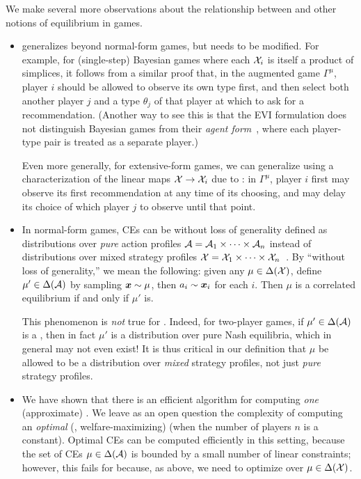 We make several more observations about the relationship between \jlces and other notions of equilibrium in games.
\begin{itemize}
    \item {} generalizes beyond normal-form games, but needs to be modified. For example, for (single-step) Bayesian games where each ${\mathcal{X}}_i$ is itself a product of simplices, it follows from a similar proof that, in the augmented game $\Gamma^\mu$, player $i$ should be allowed to observe its own type first, and then select both another player $j$ and a type $\theta_j$ of that player at which to ask for a recommendation. (Another way to see this is that the EVI formulation does not distinguish Bayesian games from their {\em agent form}~\citep{Kuhn53:Extensive}, where each player-type pair is treated as a separate player.)
    
    Even more generally, for extensive-form games, we can generalize \jlces using a characterization of the linear maps ${\mathcal{X}}\to{\mathcal{X}}_i$ due to \citet{Zhang24:Mediator}: in $\Gamma^\mu$, player $i$ first may  observe its first recommendation at any time of its choosing, and may delay its choice of which player $j$ to observe until that point.
    
    \item In normal-form games, CEs can be without loss of generality defined as distributions over {\em pure} action profiles ${\mathcal{A}} = {\mathcal{A}}_1 \times \dots \times {\mathcal{A}}_n$ instead of distributions over mixed strategy profiles ${\mathcal{X}}=  {\mathcal{X}}_1 \times \dots \times {\mathcal{X}}_n$~\citep{Aumann74:Subjectivity}. By ``without loss of generality,'' we mean the following: given any $\mu\in\Delta({\mathcal{X}})$, define $\mu'\in\Delta({\mathcal{A}})$ by sampling ${\bm{x}}\sim\mu$, then $a_i\sim{\bm{x}}_i$ for each $i$. Then $\mu$ is a correlated equilibrium if and only if $\mu'$ is.

    This phenomenon is {\em not} true for \jlces. Indeed, for two-player games, if $\mu'\in\Delta({\mathcal{A}})$ is a \jlce, then in fact $\mu'$ is a distribution over pure Nash equilibria, which in general may not even exist! It is thus critical in our definition that $\mu$ be allowed to be a distribution over {\em mixed} strategy profiles, not just {\em pure} strategy profiles.

    \item We have shown that there is an efficient algorithm for computing {\em one} (approximate) \jlce. We leave as an open question the complexity of computing an {\em optimal} (\eg, welfare-maximizing) \jlce (when the number of players $n$ is a constant). Optimal CEs can be computed efficiently in this setting, because the set of CEs $\mu\in\Delta({\mathcal{A}})$ is bounded by a small number of linear constraints; however, this fails for \jlces because, as above, we need to optimize over $\mu\in\Delta({\mathcal{X}})$.
\end{itemize}




